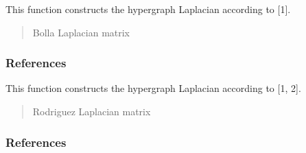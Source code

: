 \documentclass[letterpaper,10pt,english]{sphinxmanual}
\begin{document}
\begin{fulllineitems}
\begin{fulllineitems}
\end{fulllineitems}


\begin{fulllineitems}
\label{\detokenize{HAT:HAT.Hypergraph.Hypergraph.bollaLaplacian}}
\pysigstartsignatures
{}
\pysigstopsignatures
\sphinxAtStartPar
This function constructs the hypergraph Laplacian according to {[}1{]}.
\begin{quote}\begin{description}
\sphinxAtStartPar
Bolla Laplacian matrix

\sphinxAtStartPar
{}

\end{description}\end{quote}
\subsubsection*{References}

\end{fulllineitems}


\begin{fulllineitems}
\label{\detokenize{HAT:HAT.Hypergraph.Hypergraph.rodriguezLaplacian}}
\pysigstartsignatures
{}
\pysigstopsignatures
\sphinxAtStartPar
This function constructs the hypergraph Laplacian according to {[}1, 2{]}.
\begin{quote}\begin{description}
\sphinxAtStartPar
Rodriguez Laplacian matrix

\sphinxAtStartPar
{}

\end{description}\end{quote}
\subsubsection*{References}


\end{fulllineitems}
\end{fulllineitems}
\end{document}
